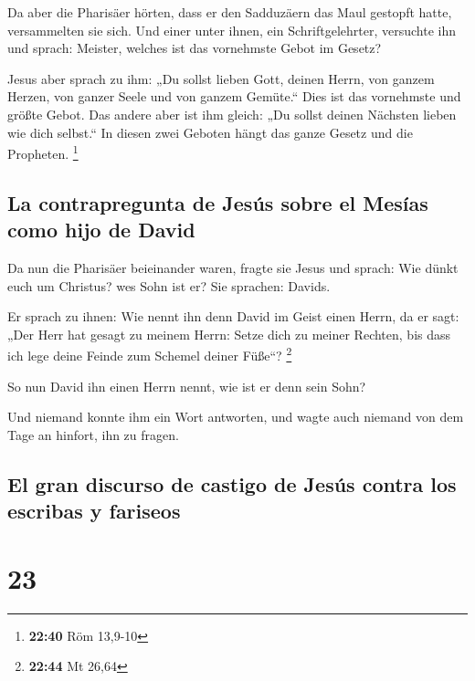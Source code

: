  Da aber die Pharisäer hörten, dass er den Sadduzäern das
Maul gestopft hatte, versammelten sie sich.  Und einer
unter ihnen, ein Schriftgelehrter, versuchte ihn und sprach:
 Meister, welches ist das vornehmste Gebot im Gesetz?

 Jesus aber sprach zu ihm: „Du sollst lieben Gott, deinen
Herrn, von ganzem Herzen, von ganzer Seele und von ganzem Gemüte.``
 Dies ist das vornehmste und größte Gebot.
 Das andere aber ist ihm gleich: „Du sollst deinen
Nächsten lieben wie dich selbst.``  In diesen zwei
Geboten hängt das ganze Gesetz und die Propheten. \footnote{\textbf{22:40}
  Röm 13,9-10}

\hypertarget{la-contrapregunta-de-jesuxfas-sobre-el-mesuxedas-como-hijo-de-david}{%
\subsection{La contrapregunta de Jesús sobre el Mesías como hijo de
David}\label{la-contrapregunta-de-jesuxfas-sobre-el-mesuxedas-como-hijo-de-david}}

 Da nun die Pharisäer beieinander waren, fragte sie Jesus
 und sprach: Wie dünkt euch um Christus? wes Sohn ist er?
Sie sprachen: Davids.

 Er sprach zu ihnen: Wie nennt ihn denn David im Geist
einen Herrn, da er sagt:  „Der Herr hat gesagt zu meinem
Herrn: Setze dich zu meiner Rechten, bis dass ich lege deine Feinde zum
Schemel deiner Füße``? \footnote{\textbf{22:44} Mt 26,64}

 So nun David ihn einen Herrn nennt, wie ist er denn sein
Sohn?

 Und niemand konnte ihm ein Wort antworten, und wagte
auch niemand von dem Tage an hinfort, ihn zu fragen.

\hypertarget{el-gran-discurso-de-castigo-de-jesuxfas-contra-los-escribas-y-fariseos}{%
\subsection{El gran discurso de castigo de Jesús contra los escribas y
fariseos}\label{el-gran-discurso-de-castigo-de-jesuxfas-contra-los-escribas-y-fariseos}}

\hypertarget{section-22}{%
\section{23}\label{section-22}}

